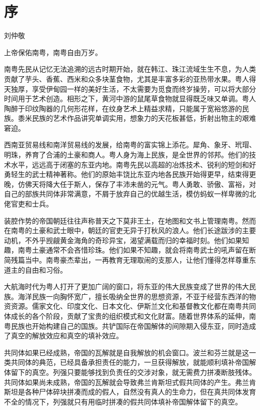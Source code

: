 
\chapter*{序}

\begin{flushright}
	刘仲敬
\end{flushright}

\begin{quoted}
	上帝保佑南粤，南粤自由万岁。
\end{quoted}

\indent 南粤先民从记忆无法追溯的远古时期开始，就在韩江、珠江流域生生不息，为人类贡献了芋头、香蕉、西米和众多块茎食物，尤其是丰富多彩的亚热带水果。粤人得天独厚，享受伊甸园一样的美好生活，不太需要为觅食而终岁操劳，可以将大部分时间用于艺术创造。相形之下，黄河中游的鼠尾草食物就显得既乏味又单调。粤人陶醉于印纹陶器的几何形花样，在纹身艺术上精益求精，只能属于宽裕悠游的民族。黍米民族的艺术作品讲究单调实用，想象力的天花板甚低，折射出物主的艰难窘迫。

西南亚贸易线和南洋贸易线的发展，给南粤的富实锦上添花。犀角、象牙、玳瑁、明珠，养育了合浦的土豪和商人。粤人身为海上民族，是全世界的邻邦。他们的技术水平，远远高于闭塞的东亚内地。南粤先民以高超的冶炼技术、锐利的短剑和好勇轻生的武士精神著称。他们的原始丰饶比东亚内地各民族开始得更早，结束得更晚，仿佛天将降大任于斯人，保存了丰沛未凿的元气。粤人勇敢、骄傲、富裕，对自己的部族共同体非常满意，不屑于放弃自己的优越生活，模仿蚂蚁一样卑微的北佬官吏和士兵。

装腔作势的帝国朝廷往往声称普天之下莫非王土，在地图和文书上管理南粤。然而在南粤的土豪和武士眼中，朝廷的官吏无异于打秋风的浪人。他们长途跋涉的主要动机，不外乎觊觎黄金海角的奇珍异宝，渴望满载而归的幸福时刻。他们如果知趣，南粤土豪通常不会吝惜珍珠。他们如果不知趣，就会将南粤武士的吼声留在断简残篇当中。南粤豪杰辈出，一再教育无理取闹的支那人，让他们懂得怎样尊重东道主的自由和习俗。

大航海时代为粤人打开了更加广阔的窗口，将东亚的伟大民族变成了世界的伟大民族。海洋民族一向胸怀宽广，擅长吸纳全世界的思想资源，不亚于经营东西洋的物资资源。儒家文化、印度文化、日本文化、伊斯兰文化和基督教文化都在南粤共同体成长的各个阶段，贡献了宝贵的组织模式和文化财富。随着世界体系的延伸，南粤民族也开始构建自己的国族。共铲国际在帝国解体的间隙期入侵东亚，同时造成了真空的解放效应和真空的填补效应。

共同体如果已经成熟，帝国的瓦解就是自我解放的机会窗口。波兰和芬兰就是这一类共同体的典范，已经具备承担责任的能力，一旦获得解放，就能顺利填补帝国解体留下的真空。列强只要能够找到负责任的交涉对象，就无需费力拼凑断肢残体。共同体如果尚未成熟，帝国的瓦解就会导致弗兰肯斯坦式假共同体的产生。弗兰肯斯坦是各种尸体碎块拼凑而成的假人，自然没有真人的生命力，但在真共同体发育不全的情况下，列强就只有用临时拼凑的假共同体填补帝国解体留下的真空。

